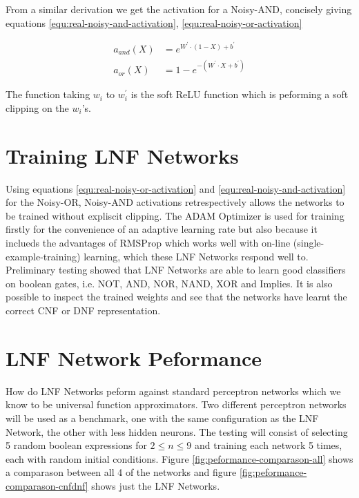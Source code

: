 From a similar derivation we get the activation for a Noisy-AND, concisely giving equations \ref{equ:real-noisy-and-activation}, \ref{equ:real-noisy-or-activation}

\begin{align}
a_{and}(X) &= e^{W^{'} \cdot (1 - X) + b^{'}} \label{equ:real-noisy-and-activation}\\
a_{or}(X)&= 1 - e^{-(W^{'} \cdot X + b^{'})} \label{equ:real-noisy-or-activation}
\end{align}

The function taking $w_i$ to $w_i^{'}$ is the soft ReLU function which is peforming a soft clipping on the $w_i$'s. 

\section{Training LNF Networks}
Using equations \ref{equ:real-noisy-or-activation} and \ref{equ:real-noisy-and-activation} for the Noisy-OR, Noisy-AND activations retrespectively allows the networks to be trained without expliscit clipping. The ADAM Optimizer is used for training firstly for the convenience of an adaptive learning rate but also because it inclueds the advantages of RMSProp which works well with on-line (single-example-training) learning, which these LNF Networks respond well to.\\

Preliminary testing showed that LNF Networks are able to learn good classifiers on boolean gates, i.e. NOT, AND, NOR, NAND, XOR and Implies. It is also possible to inspect the trained weights and see that the networks have learnt the correct CNF or DNF representation.

\section{LNF Network Peformance}
How do LNF Networks peform against standard perceptron networks which we know to be universal function approximators. Two different perceptron networks will be used as a benchmark, one with the same configuration as the LNF Network, the other with less hidden neurons. The testing will consist of selecting 5 random boolean expressions for $2 \leq n \leq 9$ and training each network 5 times, each with random initial conditions. Figure \ref{fig:peformance-comparason-all} shows a comparason between all 4 of the networks and figure \ref{fig:peformance-comparason-cnfdnf} shows just the LNF Networks.

